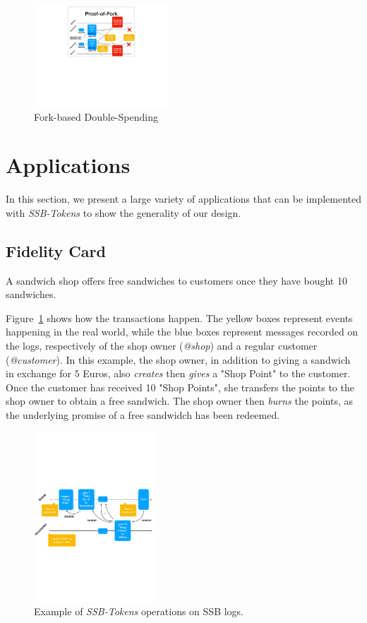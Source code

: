 \documentclass[sigplan,screen,10pt]{acmart}
\newcommand\ssbtokens[0]{\textit{SSB-Tokens} }
\begin{document}
\begin{figure}[hb]
\centering
\includegraphics[width=0.45\textwidth]{figures/fork-double-spend}
\caption{Fork-based Double-Spending}
\end{figure}



\section{Applications}
\label{section:applications}

In this section, we present a large variety of applications that can be implemented with \ssbtokens to show the generality of our design.

\subsection{Fidelity Card}

A sandwich shop offers free sandwiches to customers once they have bought 10 sandwiches. 

Figure~\ref{figure:example} shows how the transactions happen. The yellow boxes represent events happening in the real world, while the blue boxes represent messages recorded on the logs, respectively of the shop owner (\textit{@shop}) and a regular customer (\textit{@customer}). In this example, the shop owner, in addition to giving a sandwich in exchange for $5$ Euros, also \textit{creates} then \textit{gives} a "Shop Point" to the customer. Once the customer has received 10 "Shop Points", she transfers the points to the shop owner to obtain a free sandwich. The shop owner then \textit{burns} the points, as the underlying promise of a free sandwidch has been redeemed.

\begin{figure}[htb]
\includegraphics[width=0.40\textwidth]{./figures/example}
\caption{Example of \ssbtokens operations on SSB logs.}
\label{figure:example}
\end{figure}
\end{document}
